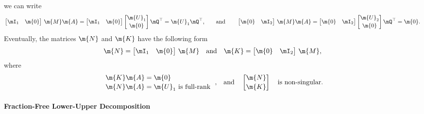 %
we can write
%
\begin{equation*}
  \begin{bmatrix} \mI_1 & \m{0} \end{bmatrix} \, \m{M}\m{A} =
  \begin{bmatrix} \mI_1 & \m{0} \end{bmatrix}
  \begin{bmatrix} \m{U}_1 \\[0.2em] \m{0} \end{bmatrix} \mQ^\top = \m{U}_1 \mQ^\top \text{,}
  \qquad \text{and} \qquad
  \begin{bmatrix} \m{0} & \mI_2 \end{bmatrix} \, \m{M}\m{A} =
  \begin{bmatrix} \m{0} & \mI_2 \end{bmatrix}
  \begin{bmatrix} \m{U}_2 \\[0.2em] \m{0} \end{bmatrix} \mQ^\top = \m{0} \text{.}
\end{equation*}
%
Eventually, the matrices $\m{N}$ and $\m{K}$ have the following form
%
\begin{equation*}
  \m{N} = \begin{bmatrix} \mI_1 & \m{0} \end{bmatrix} \, \m{M}
  \quad \text{and} \quad
  \m{K} = \begin{bmatrix} \m{0} & \mI_2 \end{bmatrix} \, \m{M},
\end{equation*}
%
where
%
\begin{equation*}
  \begin{array}{l}
      \m{K}\m{A} = \m{0} \\[0.2em]
      \m{N}\m{A} = \m{U}_1 ~ \text{is full-rank}
  \end{array} \, \text{,}
  \quad \text{and} \quad
  \begin{bmatrix} \m{N} \\[0.2em] \m{K} \end{bmatrix} \quad \text{is non-singular.}
\end{equation*}

\paragraph{Fraction-Free Lower-Upper Decomposition}

